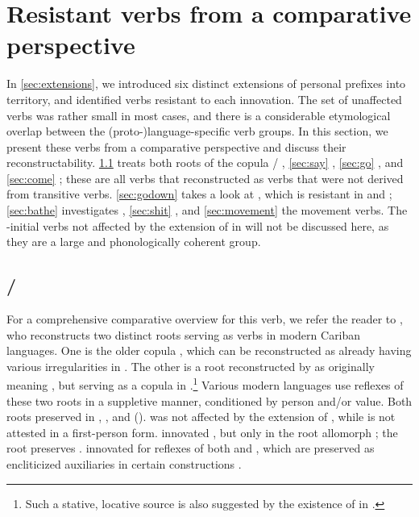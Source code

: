 \section{Resistant verbs from a comparative perspective}
\label{sec:verbs}
In \cref{sec:extensions}, we introduced six distinct extensions of personal prefixes into  territory, and identified verbs resistant to each innovation.
The set of unaffected verbs was rather small in most cases, and there is a considerable etymological overlap between the (proto-)language-specific verb groups.
In this section, we present these verbs from a comparative perspective and discuss their reconstructability.
\cref{sec:be} treats both roots of the copula / , \cref{sec:say}  , \cref{sec:go}  , and \cref{sec:come}  ; these are all verbs that \textcite{gildea2007greenberg} reconstructed as  verbs that were not derived from transitive verbs.
\cref{sec:godown} takes a look at  , which is resistant in \PTir and \PPek; \cref{sec:bathe} investigates \PPek {} , \cref{sec:shit} \trio {}, and \cref{sec:movement} the \akuriyo movement verbs.
The -initial verbs not affected by the extension of  in \akuriyo {} will not be discussed here, as they are a large and phonologically coherent group.

\subsection{/ }
\label{sec:be}
For a comprehensive comparative overview for this verb, we refer the reader to \textcite[375--382]{gildea2018reconstructing}, who reconstructs two distinct roots serving as verbs  in modern Cariban languages.
One is the older copula , which can be reconstructed as already having various irregularities in \PC.
The other is a root  reconstructed by \textcites{meira2009property}{gildea2018reconstructing} as originally meaning , but serving as a copula in \PC.\footnote{Such a stative, locative source is also suggested by the existence of   in \arara \parencite[196]{alves2017arara}.}
Various modern languages use reflexes of these two roots in a suppletive manner, conditioned by person and\slash{}or  value.
Both roots preserved   in \PPek, \PWai, and \PTir ().
\akuriyo {} was not affected by the extension of  , while  is not attested in a first-person form. 
\carijo innovated , but only in the  root allomorph ; the  root preserves  .
\yukpa innovated  for reflexes of both  and , which are preserved as encliticized auxiliaries in certain constructions .


